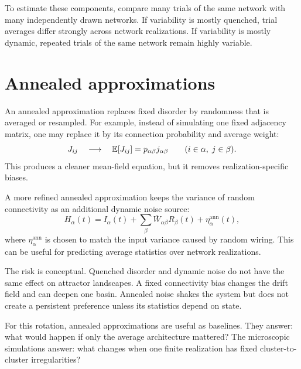 To estimate these components, compare many trials of the same network with many independently drawn networks. If variability is mostly quenched, trial averages differ strongly across network realizations. If variability is mostly dynamic, repeated trials of the same network remain highly variable.

\section{Annealed approximations}
\label{sec:annealed-approximations}

An annealed approximation replaces fixed disorder by randomness that is averaged or resampled. For example, instead of simulating one fixed adjacency matrix, one may replace it by its connection probability and average weight:
%
\begin{equation}
  J_{ij}
  \quad\longrightarrow\quad
  \mathbb{E}[J_{ij}]
  =
  p_{\alpha\beta}j_{\alpha\beta}
  \qquad
  (i\in\alpha,\;j\in\beta).
  \label{eq:annealed-connectivity}
\end{equation}
%
This produces a cleaner mean-field equation, but it removes realization-specific biases.

A more refined annealed approximation keeps the variance of random connectivity as an additional dynamic noise source:
%
\begin{equation}
  H_\alpha(t)
  =
  I_\alpha(t)
  +
  \sum_\beta \bar W_{\alpha\beta}R_\beta(t)
  +
  \eta_\alpha^{\mathrm{ann}}(t),
  \label{eq:annealed-input-noise}
\end{equation}
%
where $\eta_\alpha^{\mathrm{ann}}$ is chosen to match the input variance caused by random wiring. This can be useful for predicting average statistics over network realizations.

The risk is conceptual. Quenched disorder and dynamic noise do not have the same effect on attractor landscapes. A fixed connectivity bias changes the drift field and can deepen one basin. Annealed noise shakes the system but does not create a persistent preference unless its statistics depend on state.

For this rotation, annealed approximations are useful as baselines. They answer: what would happen if only the average architecture mattered? The microscopic simulations answer: what changes when one finite realization has fixed cluster-to-cluster irregularities?

